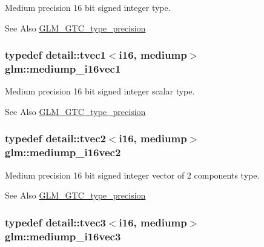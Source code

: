 Medium precision 16 bit signed integer type. \begin{DoxySeeAlso}{See Also}
\hyperlink{group__gtc__type__precision}{G\-L\-M\-\_\-\-G\-T\-C\-\_\-type\-\_\-precision} 
\end{DoxySeeAlso}
\hypertarget{group__gtc__type__precision_ga6a1d37139ea8990de24edf4bfa3500ad}{
\subsubsection[{mediump\-\_\-i16vec1}]{\setlength{\rightskip}{0pt plus 5cm}typedef detail\-::tvec1$<$i16, mediump$>$ {\bf glm\-::mediump\-\_\-i16vec1}}}\label{group__gtc__type__precision_ga6a1d37139ea8990de24edf4bfa3500ad}
Medium precision 16 bit signed integer scalar type. \begin{DoxySeeAlso}{See Also}
\hyperlink{group__gtc__type__precision}{G\-L\-M\-\_\-\-G\-T\-C\-\_\-type\-\_\-precision} 
\end{DoxySeeAlso}
\hypertarget{group__gtc__type__precision_ga664a0266910df3c2d6559651f94d32e6}{
\subsubsection[{mediump\-\_\-i16vec2}]{\setlength{\rightskip}{0pt plus 5cm}typedef detail\-::tvec2$<$i16, mediump$>$ {\bf glm\-::mediump\-\_\-i16vec2}}}\label{group__gtc__type__precision_ga664a0266910df3c2d6559651f94d32e6}
Medium precision 16 bit signed integer vector of 2 components type. \begin{DoxySeeAlso}{See Also}
\hyperlink{group__gtc__type__precision}{G\-L\-M\-\_\-\-G\-T\-C\-\_\-type\-\_\-precision} 
\end{DoxySeeAlso}
\hypertarget{group__gtc__type__precision_gad9e470f707da812fe454505c99035471}{
\subsubsection[{mediump\-\_\-i16vec3}]{\setlength{\rightskip}{0pt plus 5cm}typedef detail\-::tvec3$<$i16, mediump$>$ {\bf glm\-::mediump\-\_\-i16vec3}}}\label{group__gtc__type__precision_gad9e470f707da812fe454505c99035471}
